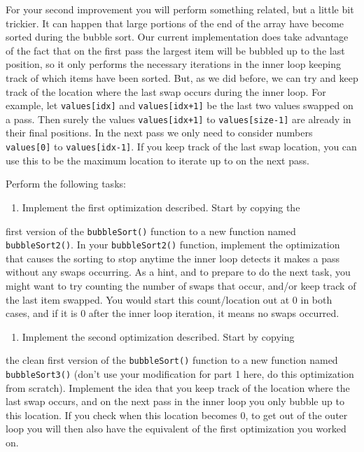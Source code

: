 \documentclass[11pt]{article}
\begin{document}
For your second improvement you will perform something related, but a
little bit trickier.  It can happen that large portions of the end of
the array have become sorted during the bubble sort.  Our current
implementation does take advantage of the fact that on the first pass
the largest item will be bubbled up to the last position, so it only
performs the necessary iterations in the inner loop keeping track of
which items have been sorted.  But, as we did before, we can try and
keep track of the location where the last swap occurs during the inner
loop.  For example, let \verb~values[idx]~ and \verb~values[idx+1]~ be the 
last two values swapped on a pass.  Then surely the values
\verb~values[idx+1]~ to \verb~values[size-1]~ are already in their final
positions.  In the next pass we only need to consider numbers
\verb~values[0]~ to \verb~values[idx-1]~.  If you keep track of the last
swap location, you can use this to be the maximum location to
iterate up to on the next pass.

Perform the following tasks:

\begin{enumerate}
\item Implement the first optimization described.  Start by copying the
\end{enumerate}
first version of the \verb~bubbleSort()~ function to a new function named
\verb~bubbleSort2()~.  In your \verb~bubbleSort2()~ function, implement the
optimization that causes the sorting to stop anytime the inner loop
detects it makes a pass without any swaps occurring.  As a hint, and
to prepare to do the next task, you might want to try counting the
number of swaps that occur, and/or keep track of the last item
swapped.  You would start this count/location out at 0 in both cases,
and if it is 0 after the inner loop iteration, it means no swaps
occurred.

\begin{enumerate}
\item Implement the second optimization described.  Start by copying
\end{enumerate}
the clean first version of the \verb~bubbleSort()~ function to a new
function named \verb~bubbleSort3()~ (don't use your modification for part 1
here, do this optimization from scratch).  Implement the idea that you
keep track of the location where the last swap occurs, and on the next
pass in the inner loop you only bubble up to this location.  If you
check when this location becomes 0, to get out of the outer loop you
will then also have the equivalent of the first optimization you
worked on.
\end{document}
